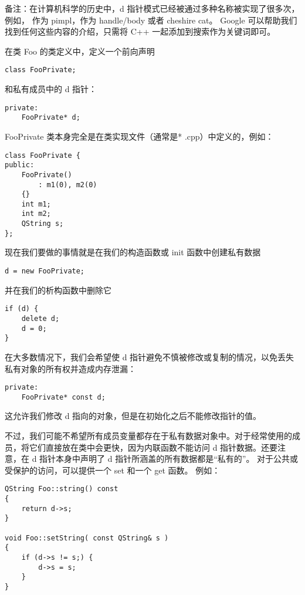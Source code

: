 备注：在计算机科学的历史中，d
指针模式已经被通过多种名称被实现了很多次，例如， 作为 pimpl，作为
handle/body 或者 cheshire cat。 Google
可以帮助我们找到任何这些内容的介绍，只需将 C++
一起添加到搜索作为关键词即可。

在类 Foo 的类定义中，定义一个前向声明

\begin{lstlisting}
class FooPrivate;
\end{lstlisting}

和私有成员中的 d 指针：

\begin{lstlisting}
private:
    FooPrivate* d;
\end{lstlisting}

FooPrivate 类本身完全是在类实现文件（通常是* .cpp）中定义的，例如：

\begin{lstlisting}
class FooPrivate {
public:
    FooPrivate()
        : m1(0), m2(0)
    {}
    int m1;
    int m2;
    QString s;
};
\end{lstlisting}

现在我们要做的事情就是在我们的构造函数或 init 函数中创建私有数据

\begin{lstlisting}
d = new FooPrivate;
\end{lstlisting}

并在我们的析构函数中删除它

\begin{lstlisting}
if (d) {
    delete d;
    d = 0;
}
\end{lstlisting}

在大多数情况下，我们会希望使 d
指针避免不慎被修改或复制的情况，以免丢失私有对象的所有权并造成内存泄漏：

\begin{lstlisting}
private:
    FooPrivate* const d;
\end{lstlisting}

这允许我们修改 d 指向的对象，但是在初始化之后不能修改指针的值。

不过，我们可能不希望所有成员变量都存在于私有数据对象中。对于经常使用的成员，将它们直接放在类中会更快，因为内联函数不能访问
d 指针数据。还要注意，在 d 指针本身中声明了 d
指针所涵盖的所有数据都是``私有的''。
对于公共或受保护的访问，可以提供一个 set 和一个 get 函数。 例如：

\begin{lstlisting}
QString Foo::string() const
{
    return d->s;
}

void Foo::setString( const QString& s )
{
    if (d->s != s;) {
        d->s = s;
    }
}
\end{lstlisting}

